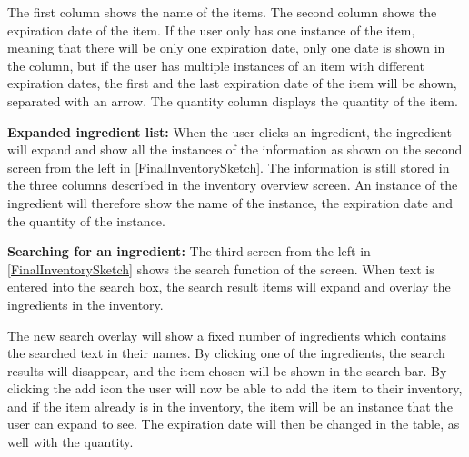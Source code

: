 The first column shows the name of the items. The second column shows the expiration date of the item. If the user only has one instance of the item, meaning that there will be only one expiration date, only one date is shown in the column, but if the user has multiple instances of an item with different expiration dates, the first and the last expiration date of the item will be shown, separated with an arrow. The quantity column displays the quantity of the item.

\textbf{Expanded ingredient list:}
When the user clicks an ingredient, the ingredient will expand and show all the instances of the information as shown on the second screen from the left in \cref{FinalInventorySketch}. The information is still stored in the three columns described in the inventory overview screen. An instance of the ingredient will therefore show the name of the instance, the expiration date and the quantity of the instance. 

\textbf{Searching for an ingredient:}
The third screen from the left in \cref{FinalInventorySketch} shows the search function of the screen. When text is entered into the search box, the search result items will expand and overlay the ingredients in the inventory.

The new search overlay will show a fixed number of ingredients which contains the searched text in their names. By clicking one of the ingredients, the search results will disappear, and the item chosen will be shown in the search bar. By clicking the add icon the user will now be able to add the item to their inventory, and if the item already is in the inventory, the item will be an instance that the user can expand to see. The expiration date will then be changed in the table, as well with the quantity.